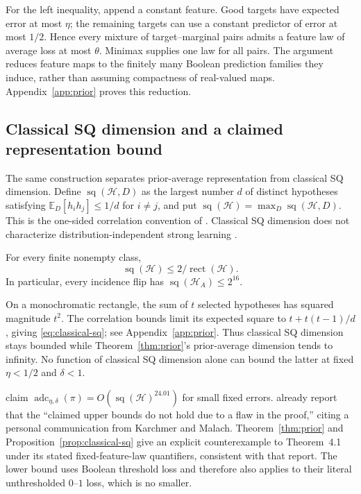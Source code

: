 \documentclass[11pt,letterpaper,pmlr,twoside]{jmlr}
\newcommand{\Hc}{\mathcal H}
\newcommand{\E}{\mathbb E}
\newcommand{\rect}{\operatorname{rect}}
\newcommand{\adc}{\operatorname{adc}}
\newcommand{\sqdim}{\operatorname{sq}}
\begin{document}
For the left inequality, append a constant feature. Good targets have expected error at most $\eta$; the remaining targets can use a constant predictor of error at most $1/2$. Hence every mixture of target--marginal pairs admits a feature law of average loss at most $\theta$. Minimax supplies one law for all pairs. The argument reduces feature maps to the finitely many Boolean prediction families they induce, rather than assuming compactness of real-valued maps. Appendix~\ref{app:prior} proves this reduction.

\subsection{Classical SQ dimension and a claimed representation bound}\label{sec:km}
The same construction separates prior-average representation from classical SQ dimension. Define $\sqdim(\Hc,D)$ as the largest number $d$ of distinct hypotheses satisfying $\E_D[h_i h_j]\le1/d$ for $i\ne j$, and put $\sqdim(\Hc)=\max_D\sqdim(\Hc,D)$. This is the one-sided correlation convention of \citet[Definition~3.5]{KM25}. Classical SQ dimension does not characterize distribution-independent strong learning \citep{Feldman17}.

\begin{proposition}\label{prop:classical-sq}
For every finite nonempty class,
\begin{equation}
 \sqdim(\Hc)\le 2/\rect(\Hc).
 \label{eq:classical-sq}
\end{equation}
In particular, every incidence flip has $\sqdim(\Hc_A)\le2^{16}$.
\end{proposition}

On a monochromatic rectangle, the sum of $t$ selected hypotheses has squared magnitude $t^2$. The correlation bounds limit its expected square to $t+t(t-1)/d$, giving \eqref{eq:classical-sq}; see Appendix~\ref{app:prior}. Thus classical SQ dimension stays bounded while Theorem~\ref{thm:prior}'s prior-average dimension tends to infinity. No function of classical SQ dimension alone can bound the latter at fixed $\eta<1/2$ and $\delta<1$.

\citet[Theorem~4.1]{KM25} claim $\adc_{\eta,\delta}(\pi)=O(\sqdim(\Hc)^{24.01})$ for small fixed errors. \citet{FKS26} already report that the ``claimed upper bounds do not hold due to a flaw in the proof,'' citing a personal communication from Karchmer and Malach. Theorem~\ref{thm:prior} and Proposition~\ref{prop:classical-sq} give an explicit counterexample to Theorem~4.1 under its stated fixed-feature-law quantifiers, consistent with that report. The lower bound uses Boolean threshold loss and therefore also applies to their literal unthresholded $0$--$1$ loss, which is no smaller.
\end{document}
